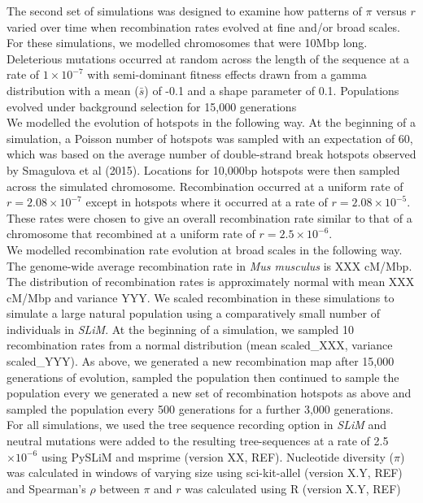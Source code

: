 \documentclass[10pt,twoside, twocolumn]{GSA_format}
\begin{document}
The second set of simulations was designed to examine how patterns of $\pi$ versus $r$ varied over time when recombination rates evolved at fine and/or broad scales. For these simulations, we modelled chromosomes that were 10Mbp long. Deleterious mutations occurred at random across the length of the sequence at a rate of $1\times10^{-7}$ with semi-dominant fitness effects drawn from a gamma distribution with a mean ($\bar{s}$) of -0.1 and a shape parameter of 0.1. Populations evolved under background selection for 15,000 generations  \\

We modelled the evolution of hotspots in the following way. At the beginning of a simulation, a Poisson number of hotspots was sampled with an expectation of 60, which was based on the average number of double-strand break hotspots observed by Smagulova et al (2015). Locations for 10,000bp hotspots were then sampled across the simulated chromosome. Recombination occurred at a uniform rate of $r=2.08\times10^{-7}$ except in hotspots where it occurred at a rate of $r=2.08\times10^{-5}$. These rates were chosen to give an overall recombination rate similar to that of a chromosome that recombined at a uniform rate of $r=2.5\times10^{-6}$. \\

We modelled recombination rate evolution at broad scales in the following way. The genome-wide average recombination rate in \textit{Mus musculus} is XXX cM/Mbp. The distribution of recombination rates is approximately normal with mean XXX cM/Mbp and variance YYY. We scaled recombination in these simulations to simulate a large natural population using a comparatively small number of individuals in \textit{SLiM}. At the beginning of a simulation, we sampled  10 recombination rates from a normal distribution (mean scaled\_XXX, variance scaled\_YYY). As above, we generated a new recombination map after 15,000 generations of evolution, sampled the population then continued to sample the population every 
we generated a new set of recombination hotspots as above and sampled the population every 500 generations for a further 3,000 generations. \\

For all simulations, we used the tree sequence recording option in \textit{SLiM} and neutral mutations were added to the resulting tree-sequences at a rate of 2.5$\times10^{-6}$ using PySLiM and msprime (version XX, REF). Nucleotide diversity ($\pi$) was calculated in windows of varying size using sci-kit-allel (version X.Y, REF) and Spearman's $\rho$ between $\pi$ and $r$ was calculated using R (version X.Y, REF)
\end{document}
